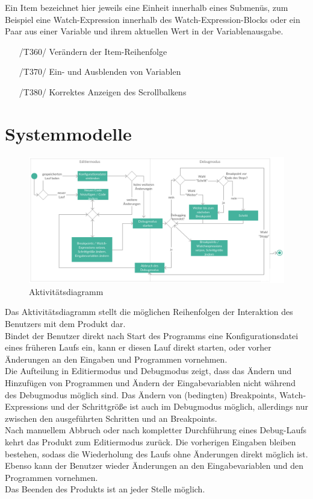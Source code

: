 \documentclass[parskip=full]{scrartcl}
\begin{document}
Ein Item bezeichnet hier jeweils eine Einheit innerhalb eines Submenüs, zum Beispiel eine Watch-Expression innerhalb des Watch-Expression-Blocks oder ein Paar aus einer Variable und ihrem aktuellen Wert in der Variablenausgabe.

\begin{itemize}

	\item[/T360/] Verändern der Item-Reihenfolge
	\item[/T370/] Ein- und Ausblenden von Variablen
	\item[/T380/] Korrektes Anzeigen des Scrollbalkens
\end{itemize}


\newpage
\section{Systemmodelle}
\begin{figure}[h] 
  \centering
     \includegraphics[width=1.0\textwidth]{Aktivitaetsdiagramm}
  \caption{Aktivitätsdiagramm}
  \label{fig:Bild2}
\end{figure}
\vspace{0.7cm}
Das Aktivitätsdiagramm stellt die möglichen Reihenfolgen der Interaktion des Benutzers mit dem Produkt dar. \\
Bindet der Benutzer direkt nach Start des Programms eine \gls{Konfigurationsdatei} eines früheren Laufs ein, kann er diesen Lauf direkt starten, oder vorher Änderungen an den Eingaben und Programmen vornehmen. \\
Die Aufteilung in \gls{Editiermodus} und \gls{Debugmodus} zeigt, dass das Ändern und Hinzufügen von Programmen und Ändern der Eingabevariablen nicht während des \gls{Debugmodus} möglich sind. Das Ändern von (bedingten) \glspl{Breakpoint}, \glspl{Watch-Expression} und der Schrittgröße ist auch im Debugmodus möglich, allerdings nur zwischen den ausgeführten Schritten und an \glspl{Breakpoint}. \\
Nach manuellem Abbruch oder nach kompletter Durchführung eines Debug-Laufs kehrt das Produkt zum \gls{Editiermodus} zurück. Die vorherigen Eingaben bleiben bestehen, sodass die Wiederholung des Laufs ohne Änderungen direkt möglich ist. Ebenso kann der Benutzer wieder Änderungen an den Eingabevariablen und den Programmen vornehmen.\\
Das Beenden des Produkts ist an jeder Stelle möglich.
\end{document}
